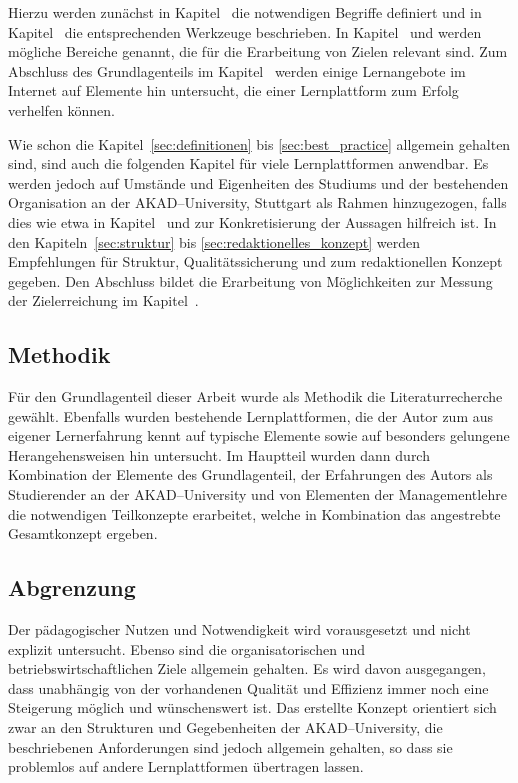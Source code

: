 Hierzu werden zunächst in Kapitel~ die notwendigen Begriffe definiert und in Kapitel~ die entsprechenden Werkzeuge beschrieben. In Kapitel~ und  werden mögliche Bereiche genannt, die für die Erarbeitung von Zielen relevant sind. Zum Abschluss des Grundlagenteils im Kapitel~ werden einige Lernangebote im Internet auf Elemente hin untersucht, die einer Lernplattform zum Erfolg verhelfen können.

Wie schon die Kapitel~\ref{sec:definitionen} bis \ref{sec:best_practice} allgemein gehalten sind, sind auch die folgenden Kapitel für viele Lernplattformen anwendbar. Es werden jedoch auf Umstände und Eigenheiten des Studiums und der bestehenden Organisation an der AKAD–University, Stuttgart als Rahmen hinzugezogen, falls dies wie etwa in Kapitel~ und  zur Konkretisierung der Aussagen hilfreich ist. In den Kapiteln~\ref{sec:struktur} bis \ref{sec:redaktionelles_konzept} werden Empfehlungen für Struktur, Qualitätssicherung und zum redaktionellen Konzept gegeben. Den Abschluss bildet die Erarbeitung von Möglichkeiten zur Messung der Zielerreichung im Kapitel~.

\subsection{Methodik} %
\label{sub:methodik}
Für den Grundlagenteil dieser Arbeit wurde als Methodik die Literaturrecherche gewählt. Ebenfalls wurden bestehende Lernplattformen, die der Autor zum aus eigener Lernerfahrung kennt auf typische Elemente sowie auf besonders gelungene Herangehensweisen hin untersucht. Im Hauptteil wurden dann durch Kombination der Elemente des Grundlagenteil, der Erfahrungen des Autors als Studierender an der AKAD–University und von Elementen der Managementlehre die notwendigen Teilkonzepte erarbeitet, welche in Kombination das angestrebte Gesamtkonzept ergeben.

\subsection{Abgrenzung} %
\label{sub:abgrenzung}
Der pädagogischer Nutzen und Notwendigkeit wird vorausgesetzt und nicht explizit untersucht. Ebenso sind die organisatorischen und betriebswirtschaftlichen Ziele allgemein gehalten. Es wird davon ausgegangen, dass unabhängig von der vorhandenen Qualität und Effizienz immer noch eine Steigerung möglich und wünschenswert ist. Das erstellte Konzept orientiert sich zwar an den Strukturen und Gegebenheiten der AKAD–University, die beschriebenen Anforderungen sind jedoch allgemein gehalten, so dass sie problemlos auf andere Lernplattformen übertragen lassen. 

